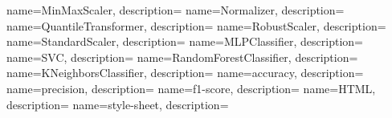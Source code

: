 {
    name={MinMaxScaler},
    description={}
}
{
    name={Normalizer},
    description={}
}
{
    name={QuantileTransformer},
    description={}
}
{
    name={RobustScaler},
    description={}
}
{
    name={StandardScaler},
    description={}
}
{
    name={MLPClassifier},
    description={}
}
{
    name={SVC},
    description={}
}
{
    name={RandomForestClassifier},
    description={}
}
{
    name={KNeighborsClassifier},
    description={}
}
{
    name={accuracy},
    description={}
}
{
    name={precision},
    description={}
}
{
    name={f1-score},
    description={}
}
{
    name={HTML},
    description={}
}
{
    name={style-sheet},
    description={}
}